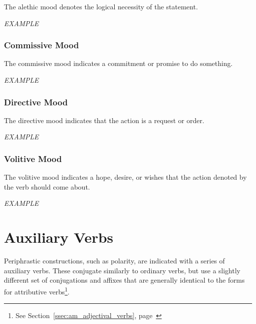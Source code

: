\documentclass[grammar]{subfiles}
\begin{document}
  The alethic mood denotes the logical necessity of the statement.

  \begin{exe}
    \ex \emph{EXAMPLE}
  \end{exe}

  \subsubsection{Commissive Mood}
  \label{sssec:vm_commissive}

  The commissive mood indicates a commitment or promise to do something.

  \begin{exe}
    \ex \emph{EXAMPLE}
  \end{exe}

  \subsubsection{Directive Mood}
  \label{sssec:vm_directive}

  The directive mood indicates that the action is a request or order.

  \begin{exe}
    \ex \emph{EXAMPLE}
  \end{exe}

  \subsubsection{Volitive Mood}
  \label{sssec:vm_optative}

  The volitive mood indicates a hope, desire, or wishes that the action denoted by the verb should come about.

  \begin{exe}
    \ex \emph{EXAMPLE}
  \end{exe}


  \section{Auxiliary Verbs}
  \label{sec:vm_auxiliary}

  Periphrastic constructions, such as polarity, are indicated with a series of auxiliary verbs. These conjugate similarly to ordinary verbs, but use a slightly different set of conjugations and affixes that are generally identical to the forms for attributive verbs\footnote{See Section~\ref{ssec:am_adjectival_verbs}, page~\pageref{ssec:am_adjectival_verbs}}. 
\end{document}
